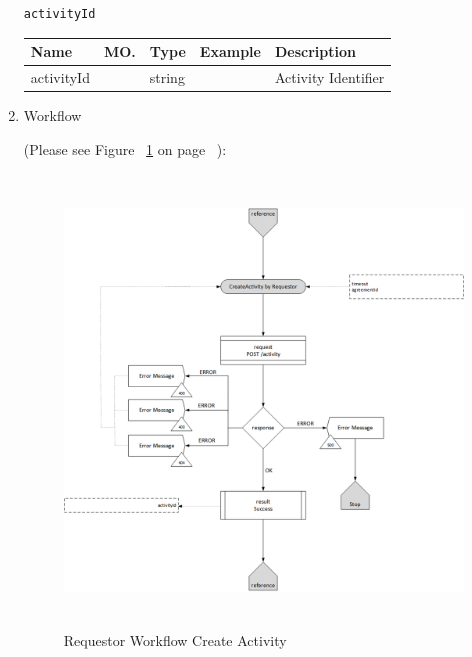 \begin{enumerate}
\begin{tcolorbox}[boxrule=0pt, frame empty]
\begin{verbatim}
activityId

\end{verbatim}
\end{tcolorbox}

\begin{table}[H]
\footnotesize

\begin{center}
\begin{tabular}{|p{3cm}|l|p{3cm}|p{3cm}|p{4cm}|} 
\hline
\rowcolor{lightgray}	Name	& MO.	& Type	& Example & 	Description \\
\hline

activityId				&	&	string				&																		&	Activity Identifier \\
\hline   

\end{tabular}
\end{center}
\end{table}

\item Workflow

(Please see Figure ~\ref{fig:RCA} on page ~\pageref{fig:RCA}):

\begin{figure}[H]
    \centering
    \includegraphics[width=12cm,height=12cm,angle=0]{./diag/Workflow/Activity/CreateActivity-R-Workflow.png}
    \caption{Requestor Workflow Create Activity }
	\label{fig:RCA}
\end{figure}


\end{enumerate}


